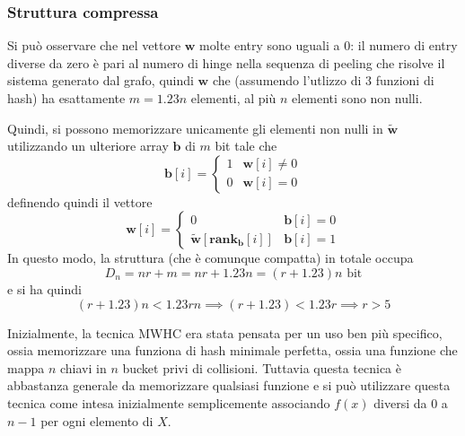 \subsubsection{Struttura compressa}
Si può osservare che nel vettore $\mathbf{w}$ molte entry sono uguali a $0$: il numero 
di entry diverse da zero è pari al numero di hinge nella sequenza di peeling 
che risolve il sistema generato dal grafo, quindi $\mathbf{w}$ che (assumendo 
l'utlizzo di $3$ funzioni di hash) ha esattamente $m = 1.23n$ elementi, al più
$n$ elementi sono non nulli. 

Quindi, si possono memorizzare unicamente gli elementi non nulli in $\tilde{\mathbf{w}}$ 
utilizzando un ulteriore array $\mathbf{b}$ di $m$ bit tale che 
$$
\mathbf{b}[i] = \begin{cases}
    1 & \mathbf{w}[i] \neq 0 \\
    0 & \mathbf{w}[i] = 0
\end{cases}
$$
definendo quindi il vettore 
$$
\mathbf{w}[i] = \begin{cases}
    0 & \mathbf{b}[i] = 0 \\
    \tilde{\mathbf{w}}[\mathbf{rank_b}[i]] & \mathbf{b}[i] = 1
\end{cases}
$$
In questo modo, la struttura (che è comunque compatta) in totale occupa 
$$
D_n = nr + m = nr + 1.23n = (r + 1.23) n \text{ bit}
$$
e si ha quindi 
$$
(r + 1.23 ) n < 1.23rn \implies (r + 1.23) < 1.23r  \implies r > 5
$$

\noindent
Inizialmente, la tecnica MWHC era stata pensata per un uso ben più specifico, 
ossia memorizzare una funziona di hash minimale perfetta, ossia una funzione
che mappa $n$ chiavi in $n$ bucket privi di collisioni. 
Tuttavia questa tecnica è abbastanza generale da memorizzare qualsiasi funzione e 
si può utilizzare questa tecnica come intesa inizialmente semplicemente associando 
$f(x)$ diversi da $0$ a $n-1$ per ogni elemento di $X$. 
